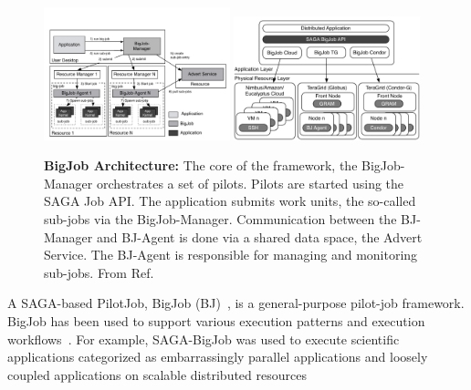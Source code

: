 \documentclass[]{svjour3}
\begin{document}
\begin{figure}[t]
 \centering
  \includegraphics[width=0.48\textwidth]{figures/re_bigjob_interactions.pdf}
 \includegraphics[width=0.48\textwidth]{figures/distributed_pilot_job.pdf}

    \caption{\textbf{BigJob Architecture:} The core of the
     framework, the BigJob-Manager orchestrates a set of
     pilots. Pilots are started using the SAGA Job API. The
     application submits work units, the so-called sub-jobs via the
     BigJob-Manager. Communication between the BJ-Manager and
     BJ-Agent is done via a shared data space, the Advert
     Service. The BJ-Agent is responsible for managing and
     monitoring sub-jobs. From
     Ref.~\cite{saga_bigjob_condor_cloud}}
    \label{fig:figures_re_bigjob_interactions}
\end{figure}

A SAGA-based PilotJob, BigJob (BJ)~\cite{bigjob_web,saga_bigjob_condor_cloud}, is a
general-purpose pilot-job framework. BigJob has been used to support various
execution patterns and execution workflows~\cite{async_repex11,saga-royalsoc}.
For example, SAGA-BigJob was used to execute scientific
applications categorized as embarrassingly parallel applications and
loosely coupled applications on scalable distributed
resources~\cite{ecmls_ccpe10, dare-ecmls11}
\end{document}
